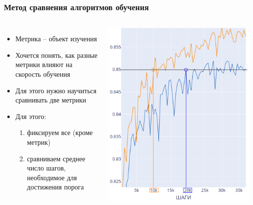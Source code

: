 \documentclass{beamer}
\begin{document}
\begin{frame}
	\frametitle{Метод сравнения алгоритмов обучения}
	\begin{columns}
		
		\begin{itemize}
			\item Метрика -- объект изучения
			\item Хочется понять, как разные метрики влияют на скорость обучения
			\item Для этого нужно научиться сравнивать две метрики
			\item Для этого:
			\begin{enumerate}
				\item фиксируем все (кроме метрик)
				\item сравниваем среднее число шагов, необходимое для достижения порога
			\end{enumerate}
		\end{itemize}
		
		\includegraphics[scale=0.25]{compare}
	\end{columns}
\end{frame}
\end{document}

